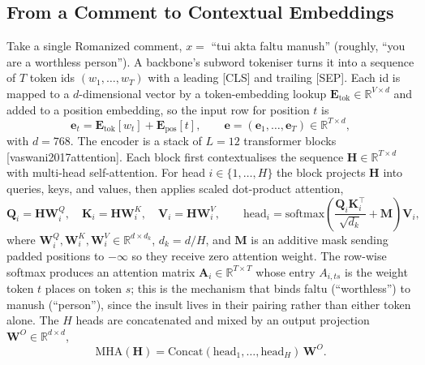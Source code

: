 \documentclass[11pt,a4paper]{article}
\def\citep#1{[#1]}%
\def\texttt#1{#1}%
\def\emph#1{#1}%
\begin{document}
\subsection{From a Comment to Contextual Embeddings}
\label{sec:prelim}

Take a single Romanized comment, $x = $ \emph{``tui akta faltu manush''} (roughly, \emph{``you are a worthless person''}). A backbone's subword tokeniser turns it into a sequence of $T$ token ids $(w_1,\ldots,w_T)$ with a leading \texttt{[CLS]} and trailing \texttt{[SEP]}. Each id is mapped to a $d$-dimensional vector by a token-embedding lookup $\mathbf{E}_{\mathrm{tok}} \in \mathbb{R}^{V \times d}$ and added to a position embedding, so the input row for position $t$ is
\begin{equation}
\mathbf{e}_t = \mathbf{E}_{\mathrm{tok}}[w_t] + \mathbf{E}_{\mathrm{pos}}[t], \qquad \mathbf{e} = (\mathbf{e}_1,\ldots,\mathbf{e}_T) \in \mathbb{R}^{T \times d},
\label{eq:embed}
\end{equation}
with $d = 768$. The encoder is a stack of $L = 12$ transformer blocks \citep{vaswani2017attention}. Each block first contextualises the sequence $\mathbf{H} \in \mathbb{R}^{T \times d}$ with multi-head self-attention. For head $i \in \{1,\ldots,H\}$ the block projects $\mathbf{H}$ into queries, keys, and values, then applies scaled dot-product attention,
\begin{equation}
\mathbf{Q}_i = \mathbf{H}\mathbf{W}^Q_i,\quad \mathbf{K}_i = \mathbf{H}\mathbf{W}^K_i,\quad \mathbf{V}_i = \mathbf{H}\mathbf{W}^V_i,
\qquad
\mathrm{head}_i = \mathrm{softmax}\!\left(\frac{\mathbf{Q}_i \mathbf{K}_i^{\top}}{\sqrt{d_k}} + \mathbf{M}\right)\mathbf{V}_i,
\label{eq:attention}
\end{equation}
where $\mathbf{W}^Q_i, \mathbf{W}^K_i, \mathbf{W}^V_i \in \mathbb{R}^{d \times d_k}$, $d_k = d/H$, and $\mathbf{M}$ is an additive mask sending padded positions to $-\infty$ so they receive zero attention weight. The row-wise softmax produces an attention matrix $\mathbf{A}_i \in \mathbb{R}^{T \times T}$ whose entry $A_{i,ts}$ is the weight token $t$ places on token $s$; this is the mechanism that binds \emph{faltu} (``worthless'') to \emph{manush} (``person''), since the insult lives in their pairing rather than either token alone. The $H$ heads are concatenated and mixed by an output projection $\mathbf{W}^O \in \mathbb{R}^{d \times d}$,
\begin{equation}
\mathrm{MHA}(\mathbf{H}) = \mathrm{Concat}(\mathrm{head}_1,\ldots,\mathrm{head}_H)\,\mathbf{W}^O .
\label{eq:mha}
\end{equation}
\end{document}
